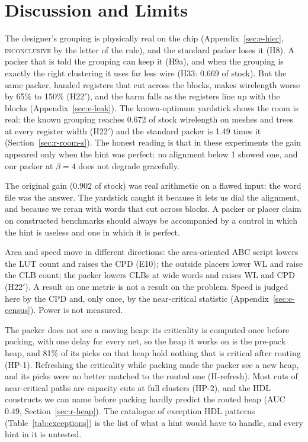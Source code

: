 \section{Discussion and Limits}
\label{sec:discussion}

 The designer's grouping is physically real on the chip (Appendix~\ref{sec:e-hier}, \textsc{inconclusive} by the letter of the rule), and the standard packer loses it (H8). A packer that is told the grouping can keep it (H9a), and when the grouping is exactly the right clustering it uses far less wire (H33: 0.669 of stock). But the same packer, handed registers that cut across the blocks, makes wirelength worse by 65\% to 150\% (H22$'$), and the harm falls as the registers line up with the blocks (Appendix~\ref{sec:e-leak}). The known-optimum yardstick shows the room is real: the known grouping reaches 0.672 of stock wirelength on meshes and trees at every register width (H22$'$) and the standard packer is 1.49 times it (Section~\ref{sec:r-room-s}). The honest reading is that in these experiments the gain appeared only when the hint was perfect: no alignment below 1 showed one, and our packer at $\beta=4$ does not degrade gracefully.

 The original gain (0.902 of stock) was real arithmetic on a flawed input: the word file was the answer. The yardstick caught it because it lets us dial the alignment, and because we reran with words that cut across blocks. A packer or placer claim on constructed benchmarks should always be accompanied by a control in which the hint is useless and one in which it is perfect.

 Area and speed move in different directions: the area-oriented ABC script lowers the LUT count and raises the CPD (E10); the outside placers lower WL and raise the CLB count; the packer lowers CLBs at wide words and raises WL and CPD (H22$'$). A result on one metric is not a result on the problem. Speed is judged here by the CPD and, only once, by the near-critical statistic (Appendix~\ref{sec:e-census}). Power is not measured.

 The packer does not see a moving heap: its criticality is computed once before packing, with one delay for every net, so the heap it works on is the pre-pack heap, and 81\% of its picks on that heap hold nothing that is critical after routing (HP-1). Refreshing the criticality while packing made the packer see a new heap, and its picks were no better matched to the routed one (H-refresh). Most cuts of near-critical paths are capacity cuts at full clusters (HP-2), and the HDL constructs we can name before packing hardly predict the routed heap (AUC 0.49, Section~\ref{sec:r-heap}). The catalogue of exception HDL patterns (Table~\ref{tab:exceptions}) is the list of what a hint would have to handle, and every hint in it is untested.

